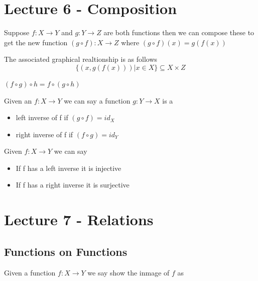 \documentclass{article}
\begin{document}
\section{Lecture 6 - Composition}
\begin{definition}
    Suppose $f:X \to Y$ and $g:Y \to Z$ are both functions then we can compose these to get the new function $(g \circ f) : X \to Z$ where $(g \circ f)(x) = g(f(x))$
\end{definition} 
The associated graphical realtionship is as follows 
\[\{(x,g(f(x)))|x \in X \} \subseteq X \times Z\]
\begin{theorem}
    $(f \circ g) \circ h = f \circ (g \circ h)$
\end{theorem}
\begin{definition}
    Given an $f:X \to Y$ we can say a function $g:Y \to X$ is a 
    \begin{itemize}
        \item left inverse of f if $(g \circ f) = id_X$
        \item right inverse of f if $(f \circ g) = id_Y$
    \end{itemize}
\end{definition}
\begin{theorem}
    Given $f:X \to Y$ we can say
    \begin{itemize}
        \item If f has a left inverse it is injective
        \item If f has a right inverse it is surjective
    \end{itemize}
\end{theorem}
\section{Lecture 7 - Relations}
\subsection{Functions on Functions}
\begin{definition}
    Given a function $f : X \to Y$ we say show the inmage of $f$ as 
\end{definition}
\end{document}
